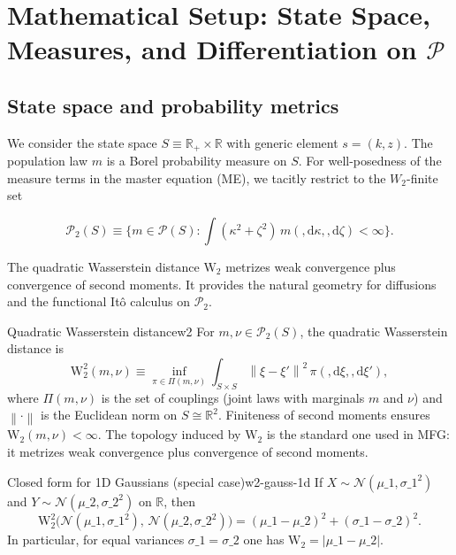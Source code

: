 ﻿\documentclass[11pt,letterpaper,oneside]{article}
\numberwithin{equation}{section}
\newcommand{\R}{\mathbb{R}}
\newcommand{\1}{\mathbf{1}}
\newcommand{\diff}{,\mathrm{d}}
\newcommand{\norm}[1]{\left\lVert #1\right\rVert}
\begin{document}
\section{Mathematical Setup: State Space, Measures, and Differentiation on \texorpdfstring{$\mathcal P$}{P}}\label{sec:math-setup}

\subsection{State space and probability metrics}\label{sec:state-metrics}
We consider the state space $S\equiv \R_+\times\R$ with generic element $s=(k,z)$. The population law $m$ is a Borel probability measure on $S$. For well-posedness of the measure terms in the master equation (ME), we tacitly restrict to the $W_2$-finite set

$$
\mathcal P_2(S)\equiv\Big\{ m\in\mathcal P(S): \int (\kappa^2 + \zeta^2)\, m(\diff\kappa,\diff\zeta) < \infty\Big\}.
$$

The quadratic Wasserstein distance $\mathrm{W}_2$ metrizes weak convergence plus convergence of second moments. It provides the natural geometry for diffusions and the functional Itô calculus on $\mathcal P_2$.

\begin{definition}{Quadratic Wasserstein distance}{w2}
For $m,\nu\in\mathcal P_2(S)$, the quadratic Wasserstein distance is
\[
\mathrm W_2^2(m,\nu) \equiv \inf_{\pi\in\Pi(m,\nu)} \int_{S\times S} \! \norm{\xi-\xi'}^2\, \pi(\diff \xi,\diff \xi'),
\]
where $\Pi(m,\nu)$ is the set of couplings (joint laws with marginals $m$ and $\nu$) and $\norm{\cdot}$ is the Euclidean norm on $S\cong\R^2$. Finiteness of second moments ensures $\mathrm W_2(m,\nu)<\infty$. The topology induced by $\mathrm W_2$ is the standard one used in MFG: it metrizes weak convergence plus convergence of second moments.
\end{definition}

\begin{lemma}{Closed form for 1D Gaussians (special case)}{w2-gauss-1d}
If $X\sim\mathcal N(\mu\_1,\sigma\_1^2)$ and $Y\sim\mathcal N(\mu\_2,\sigma\_2^2)$ on $\R$, then
\[
\mathrm W_2^2\big(\mathcal N(\mu\_1,\sigma\_1^2),\,\mathcal N(\mu\_2,\sigma\_2^2)\big) 
= (\mu\_1-\mu\_2)^2 + (\sigma\_1-\sigma\_2)^2.
\]
In particular, for equal variances $\sigma\_1=\sigma\_2$ one has $\mathrm W_2\!=|\mu\_1-\mu\_2|$.
\end{lemma}
\end{document}
